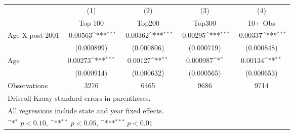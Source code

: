 {
\def\sym#1{\ifmmode^{#1}\else\(^{#1}\)\fi}
\begin{tabular}{l*{4}{c}}
\hline\hline
                &\multicolumn{1}{c}{(1)}&\multicolumn{1}{c}{(2)}&\multicolumn{1}{c}{(3)}&\multicolumn{1}{c}{(4)}\\
                &\multicolumn{1}{c}{Top 100}&\multicolumn{1}{c}{Top200}&\multicolumn{1}{c}{Top300}&\multicolumn{1}{c}{10+ Obs}\\
\hline
Age X post-2001 & -0.00563\sym{***}& -0.00362\sym{***}& -0.00295\sym{***}& -0.00337\sym{***}\\
                &(0.000899)         &(0.000806)         &(0.000719)         &(0.000848)         \\
[1em]
Age             &  0.00273\sym{***}&  0.00127\sym{**} & 0.000987\sym{*}  &  0.00134\sym{**} \\
                &(0.000914)         &(0.000632)         &(0.000565)         &(0.000653)         \\
\hline
Observations    &     3276         &     6465         &     9686         &     9714         \\
\hline \hline
\multicolumn{5}{l}{\footnotesize Driscoll-Kraay standard errors in parentheses.} \\
\multicolumn{5}{l}{\footnotesize All regressions include state and year fixed effects.} \\
\multicolumn{5}{l}{\footnotesize \sym{*} \(p<0.10\), \sym{**} \(p<0.05\), \sym{***} \(p<0.01\)}  \end{tabular} }

